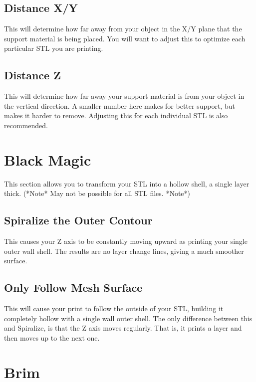 \subsection{Distance X/Y}

This will determine how far away from your object in the X/Y plane that the support material is being placed. You will want to adjust this to optimize each particular STL you are printing.

\subsection{Distance Z}

This will determine how far away your support material is from your object in the vertical direction. A smaller number here makes for better support, but makes it harder to remove. Adjusting this for each individual STL is also recommended.

\section{Black Magic}

This section allows you to transform your STL into a hollow shell, a single layer thick. (*Note* May not be possible for all STL files. *Note*)

\subsection{Spiralize the Outer Contour}

This causes your Z axis to be constantly moving upward as printing your single outer wall shell. The results are no layer change lines, giving a much smoother surface.

\subsection{Only Follow Mesh Surface}

This will cause your print to follow the outside of your STL, building it completely hollow with a single wall outer shell. The only difference between this and Spiralize, is that the Z axis moves regularly. That is, it prints a layer and then moves up to the next one.

\section{Brim}

